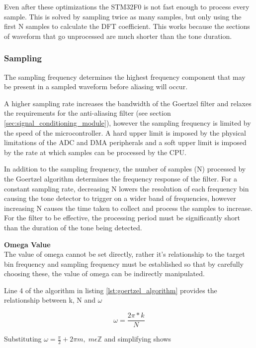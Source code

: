 Even after these optimizations the STM32F0 is not fast enough to process every sample. This is solved by sampling twice as many samples, but only using the first N samples to calculate the DFT coefficient. This works because the sections of waveform that go unprocessed are much shorter than the tone duration.

\subsubsection{Sampling}
\label{sec:sampling_frequency_constraints}
The sampling frequency determines the highest frequency component that may be present in a sampled waveform before aliasing will occur.

A higher sampling rate increases the bandwidth of the Goertzel filter and relaxes the requirements for the anti-aliasing filter (see section \ref{sec:signal_conditioning_module}), however the sampling frequency is limited by the speed of the microcontroller.
A hard upper limit is imposed by the physical limitations of the ADC and DMA peripherals and a soft upper limit is imposed by the rate at which samples can be processed by the CPU.

In addition to the sampling frequency, the number of samples (N) processed by the Goertzel algorithm determines the frequency response of the filter. For a constant sampling rate, decreasing N lowers the resolution of each frequency bin causing the tone detector to trigger on a wider band of frequencies, however increasing N causes the time taken to collect and process the samples to increase. For the filter to be effective, the processing period must be significantly short than the duration of the tone being detected.

\textbf{Omega Value}\\
The value of omega cannot be set directly, rather it's relationship to the target bin frequency and sampling frequency must be established so that by carefully choosing these, the value of omega can be indirectly manipulated.

Line 4 of the algorithm in listing \ref{lst:goertzel_algorithm} provides the relationship between k, N and $\omega$

\begin{equation}
\omega = \frac{2\pi * k}{N}
\end{equation}

Substituting \(\omega = \frac{\pi}{2} + 2\pi m,\; m\epsilon \mathbb{Z}\) and simplifying shows

